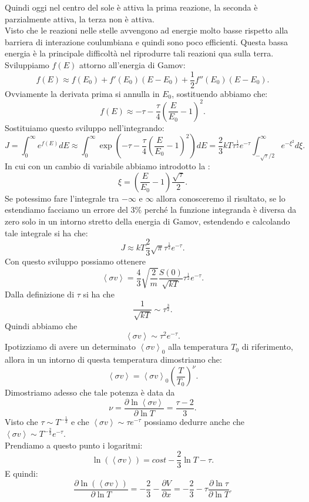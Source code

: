 Quindi oggi nel centro del sole è attiva la prima reazione, la seconda è parzialmente attiva, la terza non è attiva.\\
Visto che le reazioni nelle stelle avvengono ad energie molto basse rispetto alla barriera di interazione coulumbiana e quindi sono poco efficienti. Questa bassa energia è la principale difficoltà nel riprodurre tali reazioni qua sulla terra.\\
Sviluppiamo $f(E)$ attorno all'energia di Gamov:
\[
    f(E) \approx f(E_0) + f'(E_0) \left(E-E_0\right)+ \frac{1}{2}f''(E_0) \left(E-E_0\right)
.\] 
Ovviamente la derivata prima si annulla in $E_0$, sostituendo abbiamo che:
\[
    f(E) \approx -\tau - \frac{\tau}{4}\left(\frac{E}{E_0}-1\right)^2
.\] 
Sostituiamo questo sviluppo nell'integrando:
\[
    J=\int_{0}^{\infty} e^{f(E)}dE \approx \int_{0}^{\infty} 
    \exp\left(-\tau-\frac{\tau}{4}\left(\frac{E}{E_0}-1\right)^2\right)dE=
    \frac{2}{3}kT\tau^{\frac{1}{2}}e^{-\tau}\int_{-\sqrt{\tau}/2}^{\infty} e^{-\xi^2}d\xi 
.\] 
In cui con un cambio di variabile abbiamo introdotto la :
\[
    \xi =\left(\frac{E}{E_0}-1\right) \frac{\sqrt{\tau} }{2} 
.\] 
Se potessimo fare l'integrale tra $-\infty$ e $\infty$ allora conosceremo il risultato, se lo estendiamo facciamo un errore del $3\%$ perché la funzione integranda è diversa da zero solo in un intorno stretto della energia di Gamov, estendendo e calcolando tale integrale si ha che:
\[
J \approx kT \frac{2}{3}\sqrt{\pi} \tau^{\frac{1}{2}}e^{-\tau}
.\] 
Con questo sviluppo possiamo ottenere
\[
    \left<\sigma v\right> = \frac{4}{3}\sqrt{\frac{2}{m}} \frac{S(0)}{\sqrt{kT}}\tau^{\frac{1}{2}}e^{-\tau}
.\] 
Dalla definizione di $\tau$  si ha che 
\[
\frac{1}{\sqrt{kT}}\sim \tau^{\frac{3}{2}}
.\] 
Quindi abbiamo che 
\[
\left<\sigma v\right>\sim \tau^2e^{-\tau}
.\] 
Ipotizziamo di avere un determinato $\left< \sigma v\right>_0$ alla temperatura $T_0$ di riferimento, allora in un intorno di questa temperatura dimostriamo che:
\[
    \left<\sigma v\right> = \left<\sigma v\right>_0 \left(\frac{T}{T_0}\right)^{\nu}
.\] 
Dimostriamo adesso che tale potenza è data da 
\[
\nu=\frac{\partial \ln\left<\sigma v\right>}{\partial \ln T} = \frac{\tau-2}{3}
.\] 
Visto che $\tau\sim T^{-\frac{1}{3}}$ e che $\left<\sigma v\right>\sim \tau e^{-\tau}$ possiamo dedurre anche che $\left<\sigma v\right>\sim T^{-\frac{2}{3}}e^{-\tau}$.\\
Prendiamo a questo punto i logaritmi:
\[
    \ln\left(\left<\sigma v\right>\right) = cost -\frac{2}{3}\ln T -\tau
.\] 
E quindi:
\[
    \frac{\partial \ln\left(\left<\sigma v\right>\right)}{\partial \ln T}  =
    -\frac{2}{3}-\frac{\partial V}{\partial x} =
    -\frac{2}{3}-\tau\frac{\partial \ln\tau}{\partial \ln T} 
.\] 
